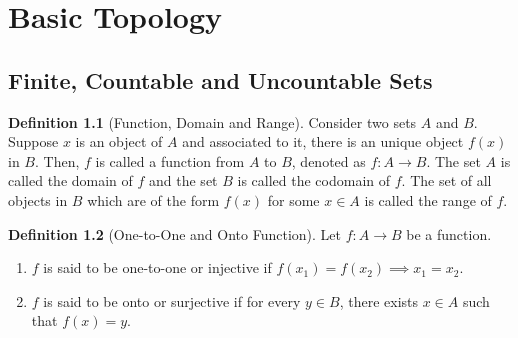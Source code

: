 \documentclass[12pt, oneside]{book}
\theoremstyle{definition}
\newtheorem{definition}{Definition}[section]
\begin{document}
\chapter{Basic Topology}
\section{Finite, Countable and Uncountable Sets}
\begin{definition}[Function, Domain and Range]
Consider two sets \(A\) and \(B\).
Suppose \(x\) is an object of \(A\) and associated to it, there is an unique object \(f(x)\) in \(B\).
Then, \(f\) is called a function from \(A\) to \(B\), denoted as \(f: A \to B\).
The set \(A\) is called the domain of \(f\) and the set \(B\) is called the codomain of \(f\).
The set of all objects in \(B\) which are of the form \(f(x)\) for some \(x \in A\) is called the range of \(f\).
\end{definition}
\begin{definition}[One-to-One and Onto Function]
	Let \(f: A \to B\) be a function.
	\begin{enumerate}
	    \item \(f\) is said to be one-to-one or injective if \(f(x_1) = f(x_2) \implies x_1 = x_2\).
        \item \(f\) is said to be onto or surjective if for every \(y \in B\), there exists \(x \in A\) such that \(f(x) = y\).
    \end{enumerate}
\end{definition}
\end{document}
